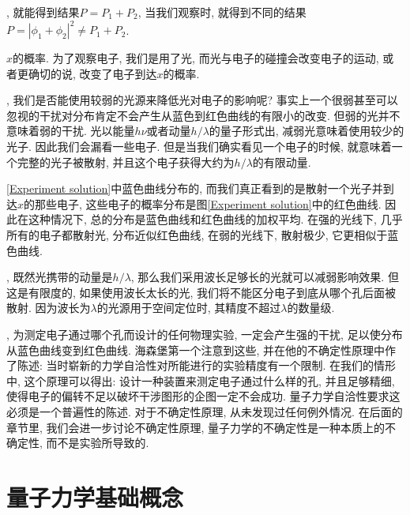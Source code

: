 \documentclass[a4paper,11pt]{book}
\begin{document}
, 就能得到结果$P=P_1+P_2$, 当我们观察时, 就得到不同的结果$P=|\phi_1+\phi_2|^2\neq P_1+P_2$.

$x$的概率. 为了观察电子, 我们是用了光, 而光与电子的碰撞会改变电子的运动, 或者更确切的说, 改变了电子到达$x$的概率.

, 我们是否能使用较弱的光源来降低光对电子的影响呢? 事实上一个很弱甚至可以忽视的干扰对分布肯定不会产生从蓝色到红色曲线的有限小的改变. 但弱的光并不意味着弱的干扰. 光以能量$h\nu$或者动量$h/\lambda$的量子形式出, 减弱光意味着使用较少的光子. 因此我们会漏看一些电子. 但是当我们确实看见一个电子的时候, 就意味着一个完整的光子被散射, 并且这个电子获得大约为$h/\lambda$的有限动量.

\ref{Experiment solution}中蓝色曲线分布的, 而我们真正看到的是散射一个光子并到达$x$的那些电子, 这些电子的概率分布是图\ref{Experiment solution}中的红色曲线. 因此在这种情况下, 总的分布是蓝色曲线和红色曲线的加权平均. 在强的光线下, 几乎所有的电子都散射光, 分布近似红色曲线, 在弱的光线下, 散射极少, 它更相似于蓝色曲线.

, 既然光携带的动量是$h/\lambda$, 那么我们采用波长足够长的光就可以减弱影响效果. 但这是有限度的, 如果使用波长太长的光, 我们将不能区分电子到底从哪个孔后面被散射. 因为波长为$\lambda$的光源用于空间定位时, 其精度不超过$\lambda$的数量级.

, 为测定电子通过哪个孔而设计的任何物理实验, 一定会产生强的干扰, 足以使分布从蓝色曲线变到红色曲线. 海森堡第一个注意到这些, 并在他的不确定性原理中作了陈述: 当时崭新的力学自洽性对所能进行的实验精度有一个限制. 在我们的情形中, 这个原理可以得出: 设计一种装置来测定电子通过什么样的孔, 并且足够精细, 使得电子的偏转不足以破坏干涉图形的企图一定不会成功. 量子力学自洽性要求这必须是一个普遍性的陈述. 对于不确定性原理, 从未发现过任何例外情况. 在后面的章节里, 我们会进一步讨论不确定性原理, 量子力学的不确定性是一种本质上的不确定性, 而不是实验所导致的.


\section{量子力学基础概念}\label{section state}
\end{document}
